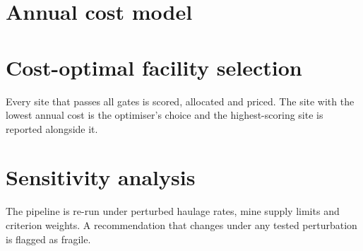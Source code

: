 \documentclass[12pt,a4paper]{report}
\begin{document}


\section{Annual cost model}


\section{Cost-optimal facility selection}
Every site that passes all gates is scored, allocated and priced. The
site with the lowest annual cost is the optimiser's choice and the
highest-scoring site is reported alongside it.



\section{Sensitivity analysis}
The pipeline is re-run under perturbed haulage rates, mine supply limits
and criterion weights. A recommendation that changes under any tested
perturbation is flagged as fragile.


\end{document}
